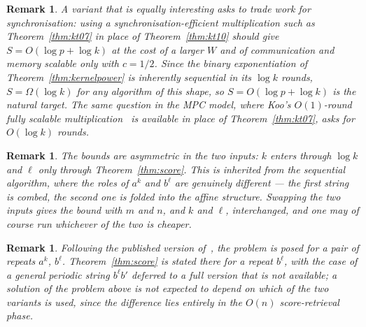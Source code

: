 \documentclass[10pt]{article}
\newtheorem{remark}[theorem]{Remark}
\begin{document}
\begin{remark}\label{rem:sync}
A variant that is equally interesting asks to trade work for synchronisation:
using a synchronisation-efficient multiplication such as
Theorem~\ref{thm:kt07} in place of Theorem~\ref{thm:kt10} should give
$S=O(\log p+\log k)$ at the cost of a larger $W$ and of communication and
memory scalable only with $c=1/2$. Since the binary exponentiation of
Theorem~\ref{thm:kernelpower} is inherently sequential in its $\log k$
rounds, $S=\Omega(\log k)$ for any algorithm of this shape, so
$S=O(\log p+\log k)$ is the natural target. The same question in the MPC
model, where Koo's $O(1)$-round fully scalable
multiplication~\cite{Koo24} is available in place of
Theorem~\ref{thm:kt07}, asks for $O(\log k)$ rounds.
\end{remark}

\begin{remark}\label{rem:asymmetry}
The bounds are asymmetric in the two inputs: $k$ enters through
$\log k$ and $\ell$ only through Theorem~\ref{thm:score}. This is inherited
from the sequential algorithm, where the roles of $a^k$ and $b^\ell$ are
genuinely different --- the first string is combed, the second one is folded
into the affine structure. Swapping the two inputs gives the bound with $m$
and $n$, and $k$ and $\ell$, interchanged, and one may of course run whichever
of the two is cheaper.
\end{remark}

\begin{remark}\label{rem:general}
Following the published version of~\cite{GZT25}, the problem is posed for a
pair of repeats $a^k$, $b^\ell$. Theorem~\ref{thm:score} is stated there for
a repeat $b^\ell$, with the case of a general periodic string $b^\ell b'$
deferred to a full version that is not available; a solution of the
problem above is not expected to depend on
which of the two variants is used, since the difference lies entirely in the
$O(n)$ score-retrieval phase.
\end{remark}
\end{document}
